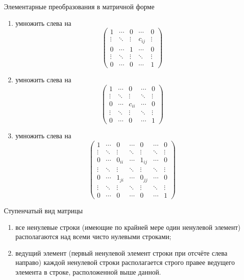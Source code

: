 \begin{Def}
Элементарные преобразования в матричной форме

\begin{enumerate}
	\item умножить слева на \[
			\begin{pmatrix}
				1     & \cdots & 0 & \cdots & 0      \\
				\vdots & \ddots & \vdots & c_{ij} & \vdots \\
				0      & \cdots & 1 & \cdots & 0      \\
				\vdots & \ddots & \vdots & \ddots & \vdots \\
				0      & \cdots & 0      & \cdots & 1
			\end{pmatrix}
		\]
	\item умножить слева на \[
			\begin{pmatrix}
				1     & \cdots & 0 & \cdots & 0      \\
				\vdots & \ddots & \vdots & \ddots & \vdots \\
				0      & \cdots & c_{ii} & \cdots & 0      \\
				\vdots & \ddots & \vdots & \ddots & \vdots \\
				0      & \cdots & 0      & \cdots & 1
			\end{pmatrix}
		\]
	\item умножить слева на \[
			\begin{pmatrix}
				1      & \cdots & 0     & \cdots & 0      & \cdots  & 0 \\
				\vdots & \ddots & \vdots & \ddots & \vdots & \ddots  & \vdots \\
				0    & \cdots & 0_{ii} & \cdots & 1_{ij}     & \cdots  & 0 \\
				\vdots & \ddots & \vdots & \ddots & \vdots & \ddots  & \vdots\\
				0      & \cdots & 1_{ji} & \cdots & 0_{jj} & \cdots  & 0 \\
				\vdots & \ddots & \vdots & \ddots & \vdots & \ddots  & \vdots\\
				0      & \cdots & 0      & \cdots & 0 	   & \cdots  & 1
			\end{pmatrix}
		\]
\end{enumerate}
\end{Def}
\begin{Def}
Ступенчатый вид матрицы

\begin{enumerate}
\item все ненулевые строки (имеющие по крайней мере один ненулевой элемент) располагаются над всеми чисто нулевыми строками;
\item   ведущий элемент (первый ненулевой элемент строки при отсчёте слева направо) каждой ненулевой строки располагается строго правее ведущего элемента в строке, расположенной выше данной.
\end{enumerate}
\end{Def}

